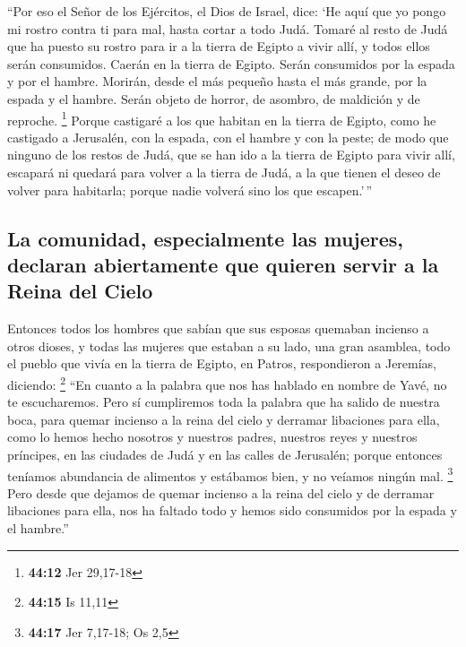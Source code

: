  ``Por eso el Señor de los Ejércitos, el Dios de Israel,
dice: `He aquí que yo pongo mi rostro contra ti para mal, hasta cortar a
todo Judá.  Tomaré al resto de Judá que ha puesto su
rostro para ir a la tierra de Egipto a vivir allí, y todos ellos serán
consumidos. Caerán en la tierra de Egipto. Serán consumidos por la
espada y por el hambre. Morirán, desde el más pequeño hasta el más
grande, por la espada y el hambre. Serán objeto de horror, de asombro,
de maldición y de reproche. \footnote{\textbf{44:12} Jer 29,17-18}
 Porque castigaré a los que habitan en la tierra de
Egipto, como he castigado a Jerusalén, con la espada, con el hambre y
con la peste;  de modo que ninguno de los restos de Judá,
que se han ido a la tierra de Egipto para vivir allí, escapará ni
quedará para volver a la tierra de Judá, a la que tienen el deseo de
volver para habitarla; porque nadie volverá sino los que escapen.'\,''

\hypertarget{la-comunidad-especialmente-las-mujeres-declaran-abiertamente-que-quieren-servir-a-la-reina-del-cielo}{%
\subsection{La comunidad, especialmente las mujeres, declaran
abiertamente que quieren servir a la Reina del
Cielo}\label{la-comunidad-especialmente-las-mujeres-declaran-abiertamente-que-quieren-servir-a-la-reina-del-cielo}}

 Entonces todos los hombres que sabían que sus esposas
quemaban incienso a otros dioses, y todas las mujeres que estaban a su
lado, una gran asamblea, todo el pueblo que vivía en la tierra de
Egipto, en Patros, respondieron a Jeremías, diciendo: \footnote{\textbf{44:15}
  Is 11,11}  ``En cuanto a la palabra que nos has hablado
en nombre de Yavé, no te escucharemos.  Pero sí
cumpliremos toda la palabra que ha salido de nuestra boca, para quemar
incienso a la reina del cielo y derramar libaciones para ella, como lo
hemos hecho nosotros y nuestros padres, nuestros reyes y nuestros
príncipes, en las ciudades de Judá y en las calles de Jerusalén; porque
entonces teníamos abundancia de alimentos y estábamos bien, y no veíamos
ningún mal. \footnote{\textbf{44:17} Jer 7,17-18; Os 2,5}
 Pero desde que dejamos de quemar incienso a la reina del
cielo y de derramar libaciones para ella, nos ha faltado todo y hemos
sido consumidos por la espada y el hambre.''

